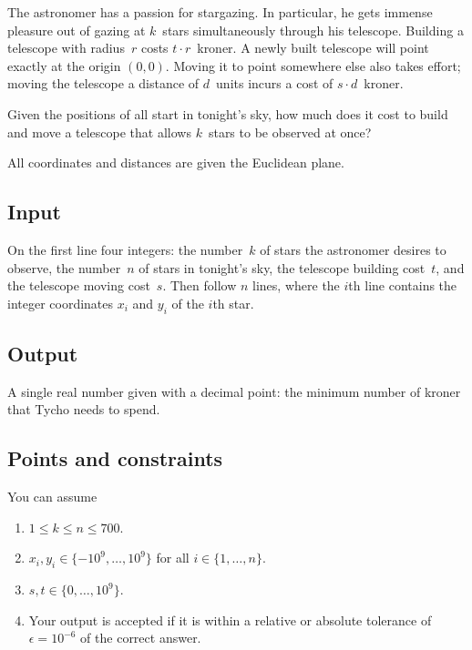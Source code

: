 
\noindent
The astronomer has a passion for stargazing.
In particular, he gets immense pleasure out of gazing at $k$~stars simultaneously through his telescope.   
Building a telescope with radius~$r$ costs $t\cdot r$~kroner.
A newly built telescope will point exactly at the origin $(0,0)$.
Moving it to point somewhere else also takes effort; 
moving the telescope a distance of $d$~units incurs a cost of $s\cdot d$~kroner.

Given the positions of all start in tonight's sky, how much does it cost to build and move a telescope that allows $k$~stars to be observed at once?

All coordinates and distances are given the Euclidean plane.


\subsection*{Input}

On the first line four integers:
the number~$k$ of stars the astronomer desires to observe,
the number~$n$ of stars in tonight's sky,
the telescope building cost~$t$, and the telescope moving cost~$s$.
Then follow $n$ lines, where the $i$th line contains the integer coordinates $x_i$ and $y_i$ of the $i$th star.

\subsection*{Output}

A single real number given with a decimal point: the minimum number of kroner that Tycho needs to spend.

\subsection*{Points and constraints}

You can assume 
\begin{enumerate}
\item $1\leq k\leq n\leq 700$. %
\item $x_i, y_i\in \{-10^9,\ldots, 10^9\}$ for all $i\in\{1,\ldots,n\}$. %
\item $s,t\in \{0,\ldots, 10^9\}$. %
\item Your output is accepted if it is within a relative or absolute tolerance of $\epsilon = 10^{-6}$ of the correct answer.
\end{enumerate}



